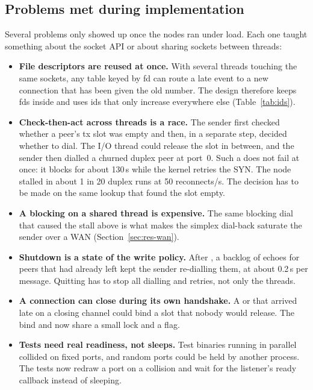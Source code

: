 \subsection{Problems met during implementation}
\label{sec:lessons}

Several problems only showed up once the nodes ran under load. Each one taught
something about the socket API or about sharing sockets between threads:
\begin{itemize}
  \item \textbf{File descriptors are reused at once.} With several threads touching
        the same sockets, any table keyed by fd can route a late event to a new
        connection that has been given the old number. The design therefore keeps fds
        inside  and uses ids that only increase everywhere else
        (Table~\ref{tab:ids}).
  \item \textbf{Check-then-act across threads is a race.} The sender first checked
        whether a peer's tx slot was empty and then, in a separate step, decided
        whether to dial. The I/O thread could release the slot in between, and the
        sender then dialled a churned duplex peer at port~0. Such a 
        does not fail at once: it blocks for about 130\,s while the kernel retries the
        SYN. The node stalled in about 1 in 20 duplex runs at 50 reconnects/s. The
        decision has to be made on the same lookup that found the slot empty.
  \item \textbf{A blocking  on a shared thread is expensive.} The
        same blocking dial that caused the stall above is what makes the simplex
        dial-back saturate the sender over a WAN (Section~\ref{sec:res-wan}).
  \item \textbf{Shutdown is a state of the write policy.} After , a
        backlog of echoes for peers that had already left kept the sender re-dialling
        them, at about 0.2\,s per message. Quitting has to stop all dialling and
        retries, not only the threads.
  \item \textbf{A connection can close during its own handshake.} A 
        or  that arrived late on a closing channel could bind a slot that
        nobody would release. The bind and  now share a small lock
        and a  flag.
  \item \textbf{Tests need real readiness, not sleeps.} Test binaries running in
        parallel collided on fixed ports, and random ports could be held by another
        process. The tests now redraw a port on a collision and wait for the
        listener's ready callback instead of sleeping.
\end{itemize}
